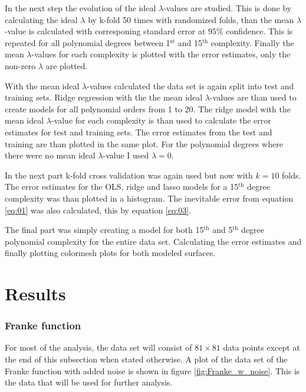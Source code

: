 \documentclass[uio,jmp,amsmath,amssymb,reprint,nofootinbib]{revtex4-1}
\numberwithin{equation}{section}
\begin{document}
In the next step the evolution of the ideal \(\lambda\)-values are studied. This is done by calculating the ideal \(\lambda\) by k-fold 50 times with randomized folds, than the mean \(\lambda\)-value is calculated with corresponing standard error at \(95\%\) confidence. This is repeated for all polynomial degrees between 1\(^\text{st}\) and 15\(^\text{th}\) complexity. Finally the mean \(\lambda\)-values for each complexity is plotted with the error estimates, only the non-zero \(\lambda\) are plotted.

With the mean ideal \(\lambda\)-values calculated the data set is again split into test and training sets. Ridge regression with the the mean ideal \(\lambda\)-values are than used to create models for all polynomial orders from 1 to 20. The ridge model with the mean ideal \(\lambda\)-value for each complexity is than used to calculate the error estimates for test and training sets. The error estimates from the test and training are than plotted in the same plot. For the polynomial degrees where there were no mean ideal \(\lambda\)-value I used \(\lambda = 0\).

In the next part k-fold cross validation was again used but now with \(k=10\) folds. The error estimates for the OLS, ridge and lasso models for a 15\(^\text{th}\) degree complexity was than plotted in a histogram. The inevitable error from equation \ref{eq:01} was also calculated, this by equation \ref{eq:03}.

The final part was simply creating a model for both 15\(^\text{th}\) and 5\(^\text{th}\) degree polynomial complexity for the entire data set. Calculating the error estimates and finally plotting colormesh plots for both modeled surfaces.


\section{Results}\label{sec:Results}

\subsubsection{Franke function}

For most of the analysis, the data set will consist of \(81\times 81\) data points except at the end of this subsection when stated otherwise. A plot of the data set of the Franke function with added noise is shown in figure \ref{fig:Franke_w_noise}. This is the data that will be used for further analysis.
\end{document}
